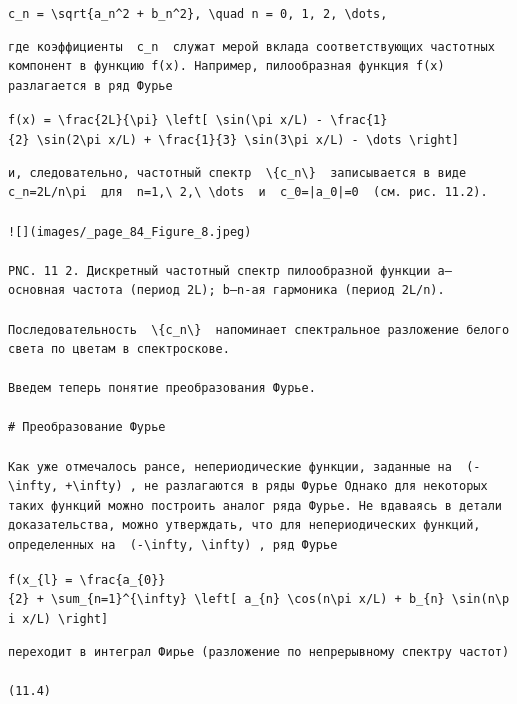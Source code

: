 \documentclass[
  ukrainian,
]{article}
\begin{document}
\texttt{c\_n\ =\ \textbackslash{}sqrt\{a\_n\^{}2\ +\ b\_n\^{}2\},\ \textbackslash{}quad\ n\ =\ 0,\ 1,\ 2,\ \textbackslash{}dots,}

\begin{verbatim}
где коэффициенты  c_n  служат мерой вклада соответствующих частотных компонент в функцию f(x). Например, пилообразная функция f(x) разлагается в ряд Фурье
\end{verbatim}

\texttt{f(x)\ =\ \textbackslash{}frac\{2L\}\{\textbackslash{}pi\}\ \textbackslash{}left{[}\ \textbackslash{}sin(\textbackslash{}pi\ x/L)\ -\ \textbackslash{}frac\{1\}\{2\}\ \textbackslash{}sin(2\textbackslash{}pi\ x/L)\ +\ \textbackslash{}frac\{1\}\{3\}\ \textbackslash{}sin(3\textbackslash{}pi\ x/L)\ -\ \textbackslash{}dots\ \textbackslash{}right{]}}

\begin{verbatim}
и, следовательно, частотный спектр  \{c_n\}  записывается в виде  c_n=2L/n\pi  для  n=1,\ 2,\ \dots  и  c_0=|a_0|=0  (см. рис. 11.2).

![](images/_page_84_Figure_8.jpeg)

PNC. 11 2. Дискретный частотный спектр пилообразной функции a— основная частота (период 2L); b—n-ая гармоника (период 2L/n).

Последовательность  \{c_n\}  напоминает спектральное разложение белого света по цветам в спектроскове.

Введем теперь понятие преобразования Фурье.

# Преобразование Фурье

Как уже отмечалось рансе, непериодические функции, заданные на  (-\infty, +\infty) , не разлагаются в ряды Фурье Однако для некоторых таких функций можно построить аналог ряда Фурье. Не вдаваясь в детали доказательства, можно утверждать, что для непериодических функций, определенных на  (-\infty, \infty) , ряд Фурье
\end{verbatim}

\texttt{f(x\_\{l\}\ =\ \textbackslash{}frac\{a\_\{0\}\}\{2\}\ +\ \textbackslash{}sum\_\{n=1\}\^{}\{\textbackslash{}infty\}\ \textbackslash{}left{[}\ a\_\{n\}\ \textbackslash{}cos(n\textbackslash{}pi\ x/L)\ +\ b\_\{n\}\ \textbackslash{}sin(n\textbackslash{}pi\ x/L)\ \textbackslash{}right{]}}

\begin{verbatim}
переходит в интеграл Фирье (разложение по непрерывному спектру частот)

(11.4)
\end{verbatim}
\end{document}
